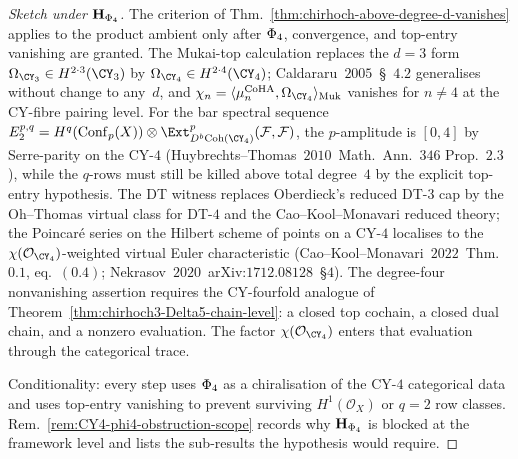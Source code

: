\begin{proof}[Sketch under $\mathbf H_{\Phi_{4}}$]
The criterion of
Thm.~\textup{\ref{thm:chirhoch-above-degree-d-vanishes}} applies to
the product ambient only after $\Phi_{4}$, convergence, and top-entry
vanishing are granted. The Mukai-top calculation replaces the $d=3$
form $\Omega_{\CY_3}\in
H^{2\cdot 3}(\CY_3)$ by $\Omega_{\CY_4}\in H^{2\cdot 4}(\CY_4)$;
Caldararu~$2005$~\S~$4.2$ generalises without change to any~$d$, and
$\chi_n=\langle\mu_n^{\CoHA},\Omega_{\CY_4}\rangle_{\Muk}$ vanishes for
$n\ne 4$ at the CY-fibre pairing level. For the bar spectral sequence
$E_2^{p,q}=H^q(\mathrm{Conf}_p(X))\otimes\Ext^p_{D^b\mathrm{Coh}(\CY_4)}
(\mathcal F,\mathcal F)$, the $p$-amplitude is $[0,4]$ by
Serre-parity on the CY-$4$
(Huybrechts--Thomas~$2010$~Math.\ Ann.\ $346$ Prop.\ $2.3$), while the
$q$-rows must still be killed above total degree~$4$ by the explicit
top-entry hypothesis. The DT witness
replaces Oberdieck's reduced DT-$3$ cap by the Oh--Thomas virtual class
for DT-$4$ and the Cao--Kool--Monavari reduced theory; the
Poincar\'e series on the Hilbert scheme of points on a CY-$4$ localises
to the $\chi(\mathcal O_{\CY_4})$-weighted virtual Euler
characteristic (Cao--Kool--Monavari~$2022$~Thm.\ $0.1$, eq.\ $(0.4)$;
Nekrasov~$2020$~arXiv:$1712.08128$~\S$4$).  The degree-four
nonvanishing assertion requires the CY-fourfold analogue of
Theorem~\ref{thm:chirhoch3-Delta5-chain-level}: a closed top cochain,
a closed dual chain, and a nonzero evaluation.  The factor
\(\chi(\mathcal O_{\CY_4})\) enters that evaluation through the
categorical trace.

Conditionality: every step uses $\Phi_{4}$ as a chiralisation of the
CY-$4$ categorical data and uses top-entry vanishing to prevent
surviving $H^1(\mathcal O_X)$ or $q=2$ row classes.
Rem.~\textup{\ref{rem:CY4-phi4-obstruction-scope}} records why
$\mathbf H_{\Phi_{4}}$ is blocked at the framework level and lists the
sub-results the hypothesis would require.
\end{proof}

